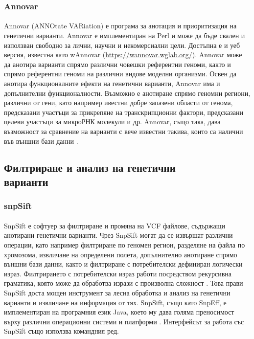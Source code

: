 \documentclass[pdftex,cyrillic,14pt,a4page,twoside,openright]{extreport}
\begin{document}
\subsubsection{Annovar}
\paragraph{}
Annovar (ANNOtate VARiation) е програма за анотация и приоритизация на генетични варианти. Annovar е имплементиран на Perl и може да бъде свален и използван свободно за лични, научни и некомерсиални цели. Достъпна е и уеб версия, известна като wAnnovar (\url{https://wannovar.wglab.org/}). Annovar може да анотира варианти спрямо различни човешки референтни геноми, както и спрямо референтни геноми на различни видове моделни организми. Освен да анотира функционалните ефекти на генетични варианти, Annovar има и допълнителни функционалности. Възможно е анотиране спрямо геномни региони, различни от гени, като например ивестни добре запазени области от генома, предсказани участъци за прикрепяне на транскрипционни фактори, предсказани целеви участъци за микроРНК молекули и др. Annovar, също така, дава възможност за сравнение на варианти с вече известни такива, които са налични във външни бази данни \cite{wang2010}.

\subsection[Филтриране и анализ на генетични варианти]{Филтриране и анализ на генетични\\ варианти}
\subsubsection{snpSift}
\paragraph{}
SnpSift е софтуер за филтриране и промяна на VCF файлове, съдържащи анотирани генетични варианти. Чрез SnpSift могат да се извършат различни операции, като например филтриране по геномен регион, разделяне на файла по хромозома, извличане на определени полета, допълнително анотиране спрямо външни бази данни, както и филтриране с потребителски дефиниран логически израз. Филтрирането с потребителски израз работи посредством рекурсивна граматика, която може да обработва изрази с произволна сложност \cite{cingolani2012sift}. Това прави SnpSift доста мощен инструмент за лесна обработка и анализ на генетични варианти и извличане на информация от тях. SnpSift, също като SnpEff, е имплементиран на програмния език Java, което му дава голяма преносимост върху различни операционни системи и платформи \cite{schildt2020complete}. Интерфейсът за работа със SnpSift също използва командния ред.
\end{document}

